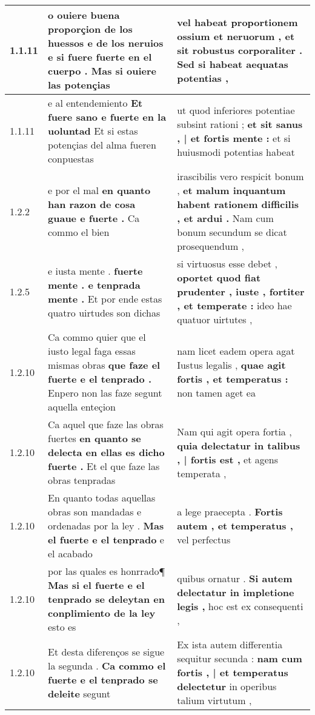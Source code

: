 \begin{tabular}{|p{1cm}|p{6.5cm}|p{6.5cm}|}

\hline
1.1.11 & o ouiere buena proporçion de los huessos e de los neruios \textbf{ e si fuere fuerte en el cuerpo . } Mas si ouiere las potençias & vel habeat proportionem ossium et neruorum , \textbf{ et sit robustus corporaliter . } Sed si habeat aequatas potentias , \\\hline
1.1.11 & e al entendemiento \textbf{ Et fuere sano e fuerte en la uoluntad } Et si estas potençias del alma fueren conpuestas & ut quod inferiores potentiae subsint rationi ; \textbf{ et sit sanus , | et fortis mente : } et si huiusmodi potentias habeat \\\hline
1.2.2 & e por el mal \textbf{ en quanto han razon de cosa guaue e fuerte . } Ca commo el bien & irascibilis vero respicit bonum , \textbf{ et malum inquantum habent rationem difficilis , et ardui . } Nam cum bonum secundum se dicat prosequendum , \\\hline
1.2.5 & e iusta mente . \textbf{ fuerte mente . e tenprada mente . } Et por ende estas quatro uirtudes son dichas & si virtuosus esse debet , \textbf{ oportet quod fiat prudenter , iuste , fortiter , et temperate : } ideo hae quatuor uirtutes , \\\hline
1.2.10 & Ca commo quier que el iusto legal faga essas mismas obras \textbf{ que faze el fuerte e el tenprado . } Enpero non las faze segunt aquella enteçion & nam licet eadem opera agat Iustus legalis , \textbf{ quae agit fortis , et temperatus : } non tamen aget ea \\\hline
1.2.10 & Ca aquel que faze las obras fuertes \textbf{ en quanto se delecta en ellas es dicho fuerte . } Et el que faze las obras tenpradas & Nam qui agit opera fortia , \textbf{ quia delectatur in talibus , | fortis est , } et agens temperata , \\\hline
1.2.10 & En quanto todas aquellas obras son mandadas e ordenadas por la ley . \textbf{ Mas el fuerte e el tenprado } e el acabado & a lege praecepta . \textbf{ Fortis autem , et temperatus , } vel perfectus \\\hline
1.2.10 & por las quales es honrrado¶ \textbf{ Mas si el fuerte e el tenprado se deleytan en conplimiento de la ley } esto es & quibus ornatur . \textbf{ Si autem delectatur in impletione legis , } hoc est ex consequenti , \\\hline
1.2.10 & Et desta diferenços se sigue la segunda . \textbf{ Ca commo el fuerte e el tenprado se deleite } segunt & Ex ista autem differentia sequitur secunda : \textbf{ nam cum fortis , | et temperatus delectetur } in operibus talium virtutum , \\\hline

\end{tabular}
